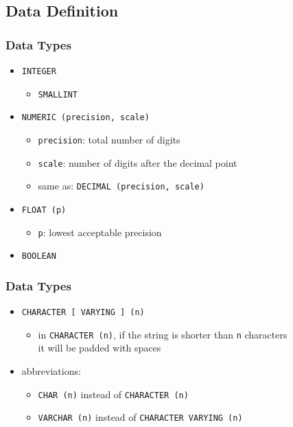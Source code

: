 \documentclass[dvipsnames]{beamer}
\theoremstyle{plain}
\begin{document}
\subsection{Data Definition}

\begin{frame}
  \frametitle{Data Types}

  \begin{itemize}
    \item \lstinline!INTEGER!
    \begin{itemize}
      \item \lstinline!SMALLINT!
    \end{itemize}

    \pause
    \medskip
    \item \lstinline!NUMERIC (precision, scale)!
    \begin{itemize}
      \item \texttt{precision}: total number of digits
      \item \texttt{scale}: number of digits after the decimal point
      \item same as: \lstinline!DECIMAL (precision, scale)!
    \end{itemize}

    \pause
    \medskip
    \item \lstinline!FLOAT (p)!
    \begin{itemize}
      \item \texttt{p}: lowest acceptable precision
    \end{itemize}

    \pause
    \medskip
    \item \lstinline!BOOLEAN!
  \end{itemize}
\end{frame}

\begin{frame}
  \frametitle{Data Types}

  \begin{itemize}
    \item \lstinline!CHARACTER [ VARYING ] (n)!
    \begin{itemize}
      \item in \lstinline!CHARACTER (n)!, if the string is shorter than
        \texttt{n} characters\\
        it will be padded with spaces
    \end{itemize}

    \pause
    \item abbreviations:
    \begin{itemize}
      \item \lstinline!CHAR (n)! instead of \lstinline!CHARACTER (n)!
      \item \lstinline!VARCHAR (n)! instead of \lstinline!CHARACTER VARYING (n)!
    \end{itemize}
  \end{itemize}
\end{frame}
\end{document}
